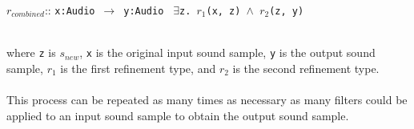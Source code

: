 \centerline{$r_{combined}$:: \texttt{x:Audio} $\,\to\,$ \texttt{y:Audio} \textbar \texttt{ $\exists$z. $r_1$(x, z) $\land$ $r_2$(z, y)}} ~\\
where \texttt{z} is $s_{new}$, \texttt{x} is the original input sound sample, \texttt{y} is the output sound sample, $r_1$ is the first refinement type, and $r_2$ is the second refinement type. \\ \\
This process can be repeated as many times as necessary as many filters could be applied to an input sound sample to obtain the output sound sample. 
\begin{comment}
The new feedback loop would look something like this: \\
\texttt{[image: CPSC490Flow2.png]}
\end{comment}




